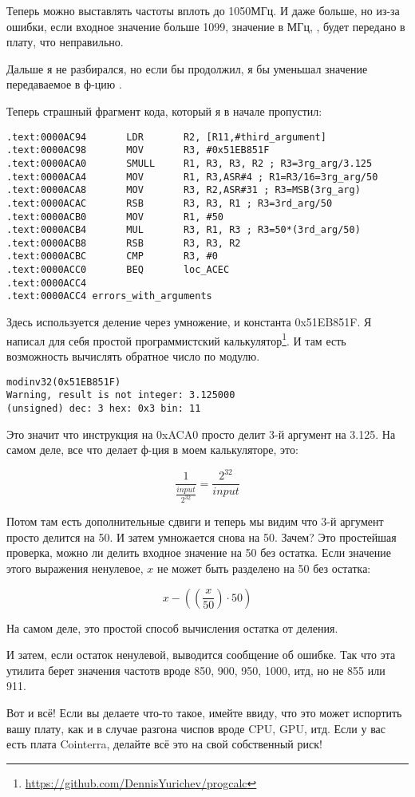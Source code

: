 Теперь можно выставлять частоты вплоть до 1050МГц. И даже больше, но из-за ошибки, если входное значение больше 1099,
значение в МГц, , будет передано в плату, что неправильно.

Дальше я не разбирался, но если бы продолжил, я бы уменьшал значение передаваемое в ф-цию .

Теперь страшный фрагмент кода, который я в начале пропустил:

\begin{lstlisting}[style=customasmARM]
.text:0000AC94       LDR       R2, [R11,#third_argument]
.text:0000AC98       MOV       R3, #0x51EB851F
.text:0000ACA0       SMULL     R1, R3, R3, R2 ; R3=3rg_arg/3.125
.text:0000ACA4       MOV       R1, R3,ASR#4 ; R1=R3/16=3rg_arg/50
.text:0000ACA8       MOV       R3, R2,ASR#31 ; R3=MSB(3rg_arg)
.text:0000ACAC       RSB       R3, R3, R1 ; R3=3rd_arg/50
.text:0000ACB0       MOV       R1, #50
.text:0000ACB4       MUL       R3, R1, R3 ; R3=50*(3rd_arg/50)
.text:0000ACB8       RSB       R3, R3, R2
.text:0000ACBC       CMP       R3, #0
.text:0000ACC0       BEQ       loc_ACEC
.text:0000ACC4
.text:0000ACC4 errors_with_arguments
\end{lstlisting}

Здесь используется деление через умножение, и константа 0x51EB851F.
Я написал для себя простой программистский калькулятор\footnote{\url{https://github.com/DennisYurichev/progcalc}}.
И там есть возможность вычислять обратное число по модулю.

\begin{lstlisting}
modinv32(0x51EB851F)
Warning, result is not integer: 3.125000
(unsigned) dec: 3 hex: 0x3 bin: 11
\end{lstlisting}

Это значит что инструкция  на 0xACA0 просто делит 3-й аргумент на 3.125.
На самом деле, все что делает ф-ция  в моем калькуляторе, это:

\[
\frac{1}{\frac{input}{2^{32}}} = \frac{2^{32}}{input}
\]

Потом там есть дополнительные сдвиги и теперь мы видим что 3-й аргумент просто делится на 50.
И затем умножается снова на 50.
Зачем?
Это простейшая проверка, можно ли делить входное значение на 50 без остатка.
Если значение этого выражения ненулевое, $x$ не может быть разделено на 50 без остатка:

\[
x-((\frac{x}{50}) \cdot 50)
\]

На самом деле, это простой способ вычисления остатка от деления.

И затем, если остаток ненулевой, выводится сообщение об ошибке.
Так что эта утилита берет значения частотв вроде 850, 900, 950, 1000, итд, но не 855 или 911.

Вот и всё! Если вы делаете что-то такое, имейте ввиду, что это может испортить вашу плату, как и в случае разгона
чиспов вроде \ac{CPU}, \ac{GPU}, итд.
Если у вас есть плата Cointerra, делайте всё это на свой собственный риск!

